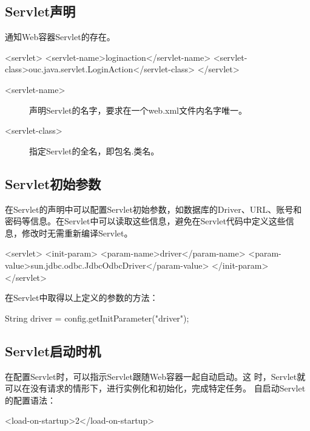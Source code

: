 \subsection{Servlet声明}

通知Web容器Servlet的存在。

\begin{xmlCode}
  <servlet>
    <servlet-name>loginaction</servlet-name>
    <servlet-class>ouc.java.servlet.LoginAction</servlet-class>
  </servlet>  
\end{xmlCode}

\begin{description}
\item[<servlet-name>] 声明Servlet的名字，要求在一个web.xml文件内名字唯一。
\item[<servlet-class>] 指定Servlet的全名，即包名.类名。
\end{description}

\subsection{Servlet初始参数}

在Servlet的声明中可以配置Servlet初始参数，如数据库的Driver、URL、账号和
密码等信息。在Servlet中可以读取这些信息，避免在Servlet代码中定义这些信
息，修改时无需重新编译Servlet。

\begin{xmlCode}
  <servlet>
    <init-param>
      <param-name>driver</param-name>
      <param-value>sun.jdbc.odbc.JdbcOdbcDriver</param-value>
    </init-param>
  </servlet>
\end{xmlCode}

在Servlet中取得以上定义的参数的方法：

\begin{javaCode}
  String driver = config.getInitParameter("driver");
\end{javaCode}

\subsection{Servlet启动时机}

在配置Servlet时，可以指示Servlet跟随Web容器一起自动启动。这
时，Servlet就可以在没有请求的情形下，进行实例化和初始化，完成特定任务。
自启动Servlet的配置语法：

\begin{xmlCode}
  <load-on-startup>2</load-on-startup>
\end{xmlCode}

